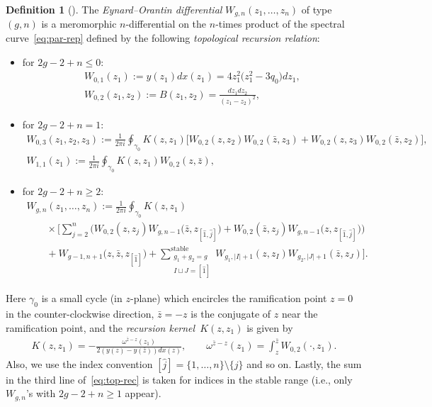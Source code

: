 \documentclass[pdftex]{sigma}
\theoremstyle{definition}
\newtheorem{Def}[thm]{Definition}
\numberwithin{equation}{section}
\begin{document}
\begin{Def}[]
The {\em Eynard--Orantin differential}
$W_{g,n}(z_{1},\dots,z_{n})$ of type $(g,n)$
is a meromorphic $n$-dif\/ferential on the $n$-times product
of the spectral curve~\eqref{eq:par-rep} def\/ined by
the following {\em topological recursion relation}:
\begin{itemize}\itemsep=0pt
\item
for $2g-2+n \le 0$:
\begin{gather*}
W_{0,1}(z_{1})   :=   y(z_{1}) dx(z_{1})  = 4z_{1}^{2} \big(z_{1}^{2}-3q_{0}\big)dz_{1}  , \\
W_{0,2}(z_{1},z_{2})   :=   B(z_1, z_2)   = \frac{dz_{1}dz_{2}}{(z_{1}-z_{2})^{2}} ,
\end{gather*}
\item %
for $2g-2+n = 1$:
\begin{gather*}
W_{0,3}(z_{1},z_{2},z_{3})   :=   \frac{1}{2\pi i}
\oint_{\gamma_{0}} K(z,z_{1}) \big[ W_{0,2}(z,z_{2}) W_{0,2}(\bar{z},z_{3})
+ W_{0,2}(z,z_{3}) W_{0,2}(\bar{z},z_{2}) \big], \\
W_{1,1}(z_{1})   :=   \frac{1}{2\pi i}
\oint_{\gamma_{0}} K(z,z_{1}) W_{0,2}(z,\bar{z}),
\end{gather*}
\item %
for $2g-2+n \ge 2$:
\begin{gather}
W_{g,n}(z_{1},\dots,z_{n}) := \frac{1}{2\pi i}
\oint_{\gamma_{0}} K(z,z_{1})   \nonumber \\
 \qquad{}\times  \Biggl[ \sum_{j=2}^{n}
\big( W_{0,2}(z,z_{j}) W_{g,n-1}\big(\bar{z}, z_{[\hat{1},\hat{j}]}\big) +
W_{0,2}(\bar{z},z_{j}) W_{g,n-1}\big(z, z_{[\hat{1},\hat{j}]}\big) \big) \nonumber \\
\qquad{}+ W_{g-1,n+1}\big(z,\bar{z},z_{[\hat{1}]}\big) +
\sum_{\substack{g_{1}+g_{2}=g \\ I \sqcup J = [\hat{1}]}}^{\text{stable}}
W_{g_{1}, |I|+1}(z,z_{I}) W_{g_{2}, |J|+1}(\bar{z}, z_{J}) \Biggr].\label{eq:top-rec}
\end{gather}
\end{itemize}
Here $\gamma_{0}$ is a small cycle (in $z$-plane) which encircles
the ramif\/ication point $z=0$ in the counter-clockwise direction,
$\bar{z} = - z$ is the conjugate of $z$ near the ramif\/ication point,
and the {\em recursion kernel}~$K(z,z_{1})$ is given by
\begin{gather*} %
K(z,z_{1}) = - \frac{\omega^{\bar{z}-z}(z_{1})}{2(y(z) - y(\bar{z}))dx(z)}, \qquad
\omega^{\bar{z}-z}(z_{1}) = \int^{\bar{z}}_{z} W_{0,2}( \cdot, z_{1}).
\end{gather*}
Also, we use the index convention
$[\hat{j}] = \{1, \dots, n \}{\setminus}\{j\}$ and so on.
Lastly, the sum in the third line of~\eqref{eq:top-rec} is taken
for indices in the stable range
(i.e., only $W_{g,n}$'s with $2g - 2 + n \ge 1$ appear).
\end{Def}
\end{document}
